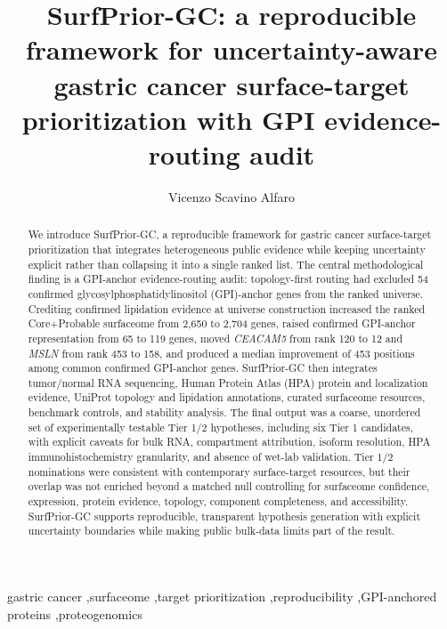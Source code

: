 \documentclass[review,12pt,authoryear]{elsarticle}
\begin{document}
\begin{frontmatter}

\title{SurfPrior-GC: a reproducible framework for uncertainty-aware gastric cancer surface-target prioritization with GPI evidence-routing audit}
\author[aff1]{Vicenzo Scavino Alfaro}

\begin{abstract}
We introduce SurfPrior-GC, a reproducible framework for gastric cancer surface-target prioritization that integrates heterogeneous public evidence while keeping uncertainty explicit rather than collapsing it into a single ranked list. The central methodological finding is a GPI-anchor evidence-routing audit: topology-first routing had excluded 54 confirmed glycosylphosphatidylinositol (GPI)-anchor genes from the ranked universe. Crediting confirmed lipidation evidence at universe construction increased the ranked Core+\allowbreak{}Probable surfaceome from 2,650 to 2,704 genes, raised confirmed GPI-anchor representation from 65 to 119 genes, moved \textit{CEACAM5} from rank 120 to 12 and \textit{MSLN} from rank 453 to 158, and produced a median improvement of 453 positions among common confirmed GPI-anchor genes. SurfPrior-GC then integrates tumor/\allowbreak{}normal RNA sequencing, Human Protein Atlas (HPA) protein and localization evidence, UniProt topology and lipidation annotations, curated surfaceome resources, benchmark controls, and stability analysis. The final output was a coarse, unordered set of experimentally testable Tier 1/\allowbreak{}2 hypotheses, including six Tier 1 candidates, with explicit caveats for bulk RNA, compartment attribution, isoform resolution, HPA immunohistochemistry granularity, and absence of wet-lab validation. Tier 1/\allowbreak{}2 nominations were consistent with contemporary surface-target resources, but their overlap was not enriched beyond a matched null controlling for surfaceome confidence, expression, protein evidence, topology, component completeness, and accessibility. SurfPrior-GC supports reproducible, transparent hypothesis generation with explicit uncertainty boundaries while making public bulk-data limits part of the result.
\end{abstract}

\begin{keyword}
gastric cancer \sep surfaceome \sep target prioritization \sep reproducibility \sep GPI-anchored proteins \sep proteogenomics
\end{keyword}

\end{frontmatter}
\end{document}
